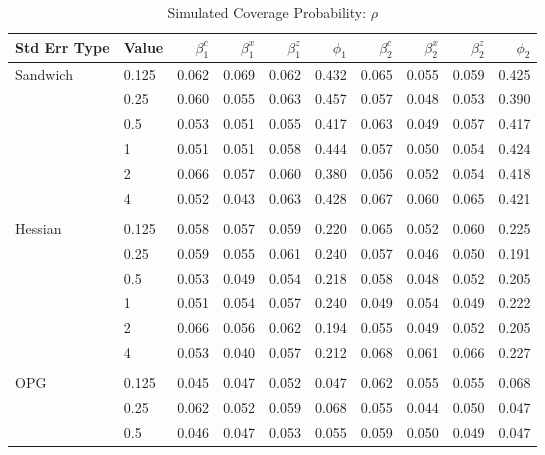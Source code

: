 \documentclass[12pt]{article}
\theoremstyle{definition}
\begin{document}
\begin{table}[b!] \centering
  \caption{Simulated Coverage Probability: $\rho$}
  \begin{threeparttable}
    {\footnotesize
    \begin{tabular}[r]{l l r r r r r r r r}
  \hline
Std Err Type & Value & $\beta_{1}^{c}$ & $\beta_{1}^{x}$ & $\beta_{1}^{z}$ & $\phi_{1}$ & $\beta_{2}^{c}$ & $\beta_{2}^{x}$ & $\beta_{2}^{z}$ & $\phi_{2}$ \\ 
  \hline

Sandwich  & 0.125 & 0.062 & 0.069 & 0.062 & 0.432 & 0.065 & 0.055 & 0.059 & 0.425 \\
          &  0.25 & 0.060 & 0.055 & 0.063 & 0.457 & 0.057 & 0.048 & 0.053 & 0.390 \\
          &   0.5 & 0.053 & 0.051 & 0.055 & 0.417 & 0.063 & 0.049 & 0.057 & 0.417 \\
          &     1 & 0.051 & 0.051 & 0.058 & 0.444 & 0.057 & 0.050 & 0.054 & 0.424 \\
          &     2 & 0.066 & 0.057 & 0.060 & 0.380 & 0.056 & 0.052 & 0.054 & 0.418 \\
          &     4 & 0.052 & 0.043 & 0.063 & 0.428 & 0.067 & 0.060 & 0.065 & 0.421 \\
          &       &       &       &       &       &       &       &       &       \\
Hessian   & 0.125 & 0.058 & 0.057 & 0.059 & 0.220 & 0.065 & 0.052 & 0.060 & 0.225 \\
          &  0.25 & 0.059 & 0.055 & 0.061 & 0.240 & 0.057 & 0.046 & 0.050 & 0.191 \\
          &   0.5 & 0.053 & 0.049 & 0.054 & 0.218 & 0.058 & 0.048 & 0.052 & 0.205 \\
          &     1 & 0.051 & 0.054 & 0.057 & 0.240 & 0.049 & 0.054 & 0.049 & 0.222 \\
          &     2 & 0.066 & 0.056 & 0.062 & 0.194 & 0.055 & 0.049 & 0.052 & 0.205 \\
          &     4 & 0.053 & 0.040 & 0.057 & 0.212 & 0.068 & 0.061 & 0.066 & 0.227 \\
          &       &       &       &       &       &       &       &       &       \\
OPG       & 0.125 & 0.045 & 0.047 & 0.052 & 0.047 & 0.062 & 0.055 & 0.055 & 0.068 \\
          &  0.25 & 0.062 & 0.052 & 0.059 & 0.068 & 0.055 & 0.044 & 0.050 & 0.047 \\
          &   0.5 & 0.046 & 0.047 & 0.053 & 0.055 & 0.059 & 0.050 & 0.049 & 0.047 \\

\end{tabular}}
\end{threeparttable}
\end{table}
\end{document}
